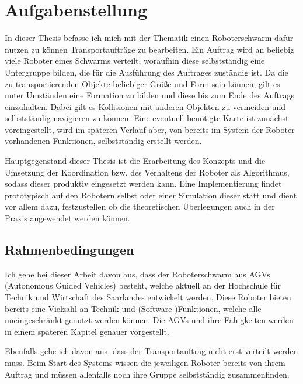 \section{Aufgabenstellung}\label{sec:Aufgabenstellung}
In dieser Thesis befasse ich mich mit der Thematik einen Roboterschwarm dafür nutzen zu können Transportaufträge zu bearbeiten. Ein Auftrag wird an beliebig viele Roboter eines Schwarms verteilt, woraufhin diese selbstständig eine Untergruppe bilden, die für die Ausführung des Auftrages zuständig ist. Da die zu transportierenden Objekte beliebiger Größe und Form sein können, gilt es unter Umständen eine Formation zu bilden und diese bis zum Ende des Auftrags einzuhalten. Dabei gilt es Kollisionen mit anderen Objekten zu vermeiden und selbstständig navigieren zu können. Eine eventuell benötigte Karte ist zunächst voreingestellt, wird im späteren Verlauf aber, von bereits im System der Roboter vorhandenen Funktionen, selbstständig erstellt werden.

Hauptgegenstand dieser Thesis ist die Erarbeitung des Konzepts und die Umsetzung der Koordination bzw. des Verhaltens der Roboter als Algorithmus, sodass dieser produktiv eingesetzt werden kann. Eine Implementierung findet prototypisch auf den Robotern selbst oder einer Simulation dieser statt und dient vor allem dazu, festzustellen ob die theoretischen Überlegungen auch in der Praxis angewendet werden können.

\subsection*{Rahmenbedingungen}\label{subsec:Rahmenbedingungen}
Ich gehe bei dieser Arbeit davon aus, dass der Roboterschwarm aus AGVs (Autonomous Guided Vehicles) besteht, welche aktuell an der Hochschule für Technik und Wirtschaft des Saarlandes entwickelt werden. Diese Roboter bieten bereits eine Vielzahl an Technik und (Software-)Funktionen, welche alle uneingeschränkt genutzt werden können. Die AGVs und ihre Fähigkeiten werden in einem späteren Kapitel genauer vorgestellt.


Ebenfalls gehe ich davon aus, dass der Transportauftrag nicht erst verteilt werden muss. Beim Start des Systems wissen die jeweiligen Roboter bereits von ihrem Auftrag und müssen allenfalls noch ihre Gruppe selbstständig zusammenfinden.

